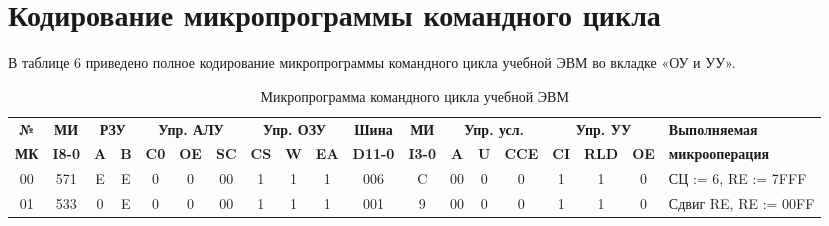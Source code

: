 \documentclass[11pt, a4paper]{article}
\begin{document}
\section{Кодирование микропрограммы командного цикла}
В таблице 6 приведено полное кодирование микропрограммы командного цикла учебной ЭВМ во вкладке «ОУ и УУ».

	{\scriptsize
		\begin{table}[h!]
			\centering
			\caption{Микропрограмма командного цикла учебной ЭВМ}
				\begin{adjustbox}{max width=\textwidth}

			\begin{tabular}{|c|c|c|c|c|c|c|c|c|c|c|c|c|c|c|c|c|c|l|}
				\hline
				\textbf{№}  & \textbf{МИ}                       & \multicolumn{2}{c|}{\textbf{РЗУ}} & \multicolumn{3}{c|}{\textbf{Упр. АЛУ}} & \multicolumn{3}{c|}{\textbf{Упр. ОЗУ}} & \textbf{Шина} & \textbf{МИ} & \multicolumn{3}{c|}{\textbf{Упр. усл.}} & \multicolumn{3}{c|}{\textbf{Упр. УУ}} & \textbf{Выполняемая}                                                                                                                                                       \\
				\textbf{МК} & \textbf{I8-0}                     & \textbf{A}                        & \textbf{B}                             & \textbf{C0}                            & \textbf{OE}   & \textbf{SC} & \textbf{CS}                             & \textbf{W}                            & \textbf{EA}          & \textbf{D11-0} & \textbf{I3-0} & \textbf{A} & \textbf{U} & \textbf{CCE} & \textbf{CI} & \textbf{RLD} & \textbf{OE} & \textbf{микрооперация}         \\
				\hline
				00          & 571                               & E                                 & E                                      & 0                                      & 0             & 00          & 1                                       & 1                                     & 1                    & 006            & C             & 00         & 0          & 0            & 1           & 1            & 0           & СЦ := 6, RE := 7FFF            \\
				01          & 533                               & 0                                 & E                                      & 0                                      & 0             & 00          & 1                                       & 1                                     & 1                    & 001            & 9             & 00         & 0          & 0            & 1           & 1            & 0           & Сдвиг RE, RE := 00FF           \\

\end{tabular}
\end{adjustbox}
\end{table}}
\end{document}
